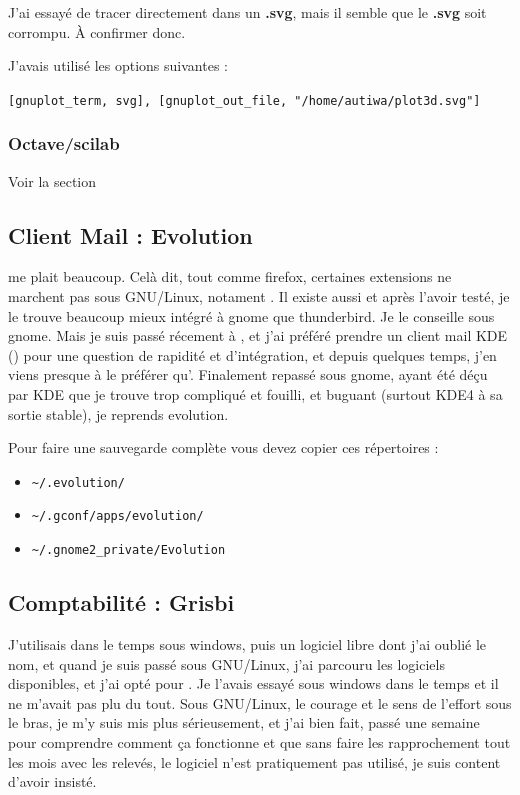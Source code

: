 \documentclass[a4paper,twoside]{article}
\begin{document}
\begin{remarque}
J'ai essayé de tracer directement dans un \textbf{.svg}, mais il semble que le \textbf{.svg} soit corrompu. À confirmer donc.

J'avais utilisé les options suivantes :

\texttt{[gnuplot\_term, svg], [gnuplot\_out\_file, "/home/autiwa/plot3d.svg"]}
\end{remarque}

\subsubsection{Octave/scilab}
Voir la section 

\subsection{Client Mail : Evolution}
 me plait beaucoup. Celà dit, tout comme firefox, certaines extensions ne marchent pas sous GNU/Linux, notament . Il existe aussi  et après l'avoir testé, je le trouve beaucoup mieux intégré à gnome que thunderbird. Je le conseille sous gnome. Mais je suis passé récement à , et j'ai préféré prendre un client mail KDE () pour une question de rapidité et d'intégration, et depuis quelques temps, j'en viens presque à le préférer qu'. Finalement repassé sous gnome, ayant été déçu par KDE que je trouve trop compliqué et fouilli, et buguant (surtout KDE4 à sa sortie stable), je reprends evolution.

\begin{remarque}
Pour faire une sauvegarde complète vous devez copier ces répertoires :
\begin{itemize}
\item  \verb|~/.evolution/|
\item  \verb|~/.gconf/apps/evolution/|
\item  \verb|~/.gnome2_private/Evolution|
\end{itemize}
\end{remarque}


\subsection{Comptabilité : Grisbi}
J'utilisais  dans le temps sous windows, puis un logiciel libre dont j'ai oublié le nom, et quand je suis passé sous GNU/Linux, j'ai parcouru les logiciels disponibles, et j'ai opté pour . Je l'avais essayé sous windows dans le temps et il ne m'avait pas plu du tout. Sous GNU/Linux, le courage et le sens de l'effort sous le bras, je m'y suis mis plus sérieusement, et j'ai bien fait, passé une semaine pour comprendre comment ça fonctionne et que sans faire les rapprochement tout les mois avec les relevés, le logiciel n'est pratiquement pas utilisé, je suis content d'avoir insisté.
\end{document}
